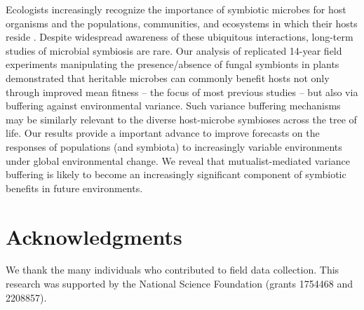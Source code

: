 \documentclass[12pt]{article}
\begin{document}
Ecologists increasingly recognize the importance of symbiotic microbes for host organisms and the populations, communities, and ecosystems in which their hosts reside \cite{rudgers2007forest, afkhami2016native, dallas2022captivity, smith2017symbiont}.
Despite widespread awareness of these ubiquitous interactions, long-term studies of microbial symbiosis are rare. 
Our analysis of replicated 14-year field experiments manipulating the presence/absence of fungal symbionts in plants demonstrated that heritable microbes can commonly benefit hosts not only through improved mean fitness -- the focus of most previous studies -- but also via buffering against environmental variance. 
Such variance buffering mechanisms may be similarly relevant to the diverse host-microbe symbioses across the tree of life.
Our results provide a important advance to improve forecasts on the responses of populations (and symbiota) to increasingly variable environments under global environmental change. We reveal that mutualist-mediated variance buffering is likely to become an increasingly significant component of symbiotic benefits in future environments.














\section*{Acknowledgments}
We thank the many individuals who contributed to field data collection. This research was supported by the National Science Foundation (grants 1754468 and 2208857). 
\end{document}
